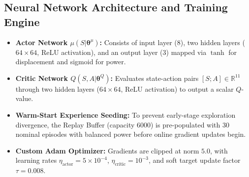 \subsection{Neural Network Architecture and Training Engine}
\begin{itemize}
    \item \textbf{Actor Network $\mu(S | \boldsymbol{\theta}^\mu)$:} Consists of input layer ($8$), two hidden layers ($64 \times 64$, ReLU activation), and an output layer ($3$) mapped via $\tanh$ for displacement and sigmoid for power.
    \item \textbf{Critic Network $Q(S, A | \boldsymbol{\theta}^Q)$:} Evaluates state-action pairs $[S; A] \in \mathbb{R}^{11}$ through two hidden layers ($64 \times 64$, ReLU activation) to output a scalar $Q$-value.
    \item \textbf{Warm-Start Experience Seeding:} To prevent early-stage exploration divergence, the Replay Buffer (capacity $6000$) is pre-populated with $30$ nominal episodes with balanced power before online gradient updates begin.
    \item \textbf{Custom Adam Optimizer:} Gradients are clipped at norm $5.0$, with learning rates $\eta_{\text{actor}} = 5 \times 10^{-4}$, $\eta_{\text{critic}} = 10^{-3}$, and soft target update factor $\tau = 0.008$.
\end{itemize}

